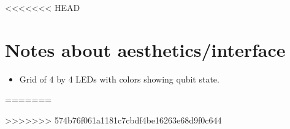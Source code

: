 \documentclass{article}
\begin{document}
<<<<<<< HEAD
\section{Notes about aesthetics/interface}
\begin{itemize}
  \item Grid of 4 by 4 LEDs with colors showing qubit state.
\end{itemize}
=======

>>>>>>> 574b76f061a1181c7cbdf4be16263e68d9f0c644
\end{document}
